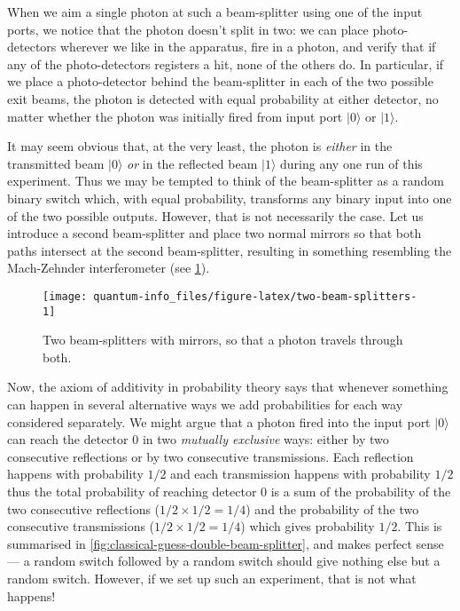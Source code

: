 \documentclass{article}
\begin{document}
When we aim a single photon at such a beam-splitter using one of the input ports, we notice that the photon doesn't split in two: we can place photo-detectors wherever we like in the apparatus, fire in a photon, and verify that if any of the photo-detectors registers a hit, none of the others do.
In particular, if we place a photo-detector behind the beam-splitter in each of the two possible exit beams, the photon is detected with equal probability at either detector, no matter whether the photon was initially fired from input port \(|0\rangle\) or \(|1\rangle\).

It may seem obvious that, at the very least, the photon is \emph{either} in the transmitted beam \(|0\rangle\) \emph{or} in the reflected beam \(|1\rangle\) during any one run of this experiment.
Thus we may be tempted to think of the beam-splitter as a random binary switch which, with equal probability, transforms any binary input into one of the two possible outputs.
However, that is not necessarily the case.
Let us introduce a second beam-splitter and place two normal mirrors so that both paths intersect at the second beam-splitter, resulting in something resembling the Mach-Zehnder interferometer (see \ref{fig:two-beam-splitters}).

\begin{figure}[H]

{\centering \texttt{[image: quantum-info\_files/figure-latex/two-beam-splitters-1]} 

}

\caption{Two beam-splitters with mirrors, so that a photon travels through both.}\label{fig:two-beam-splitters}
\end{figure}

Now, the axiom of additivity in probability theory says that whenever something can happen in several alternative ways we add probabilities for each way considered separately.
We might argue that a photon fired into the input port \(|0\rangle\) can reach the detector \(0\) in two \emph{mutually exclusive} ways: either by two consecutive reflections or by two consecutive transmissions.
Each reflection happens with probability \(1/2\) and each transmission happens with probability \(1/2\) thus the total probability of reaching detector 0 is a sum of the probability of the two consecutive reflections (\(1/2\times 1/2 = 1/4\)) and the probability of the two consecutive transmissions (\(1/2\times 1/2 = 1/4\)) which gives probability \(1/2\).
This is summarised in \ref{fig:classical-guess-double-beam-splitter}, and makes perfect sense --- a random switch followed by a random switch should give nothing else but a random switch.
However, if we set up such an experiment, that is not what happens!
\end{document}
